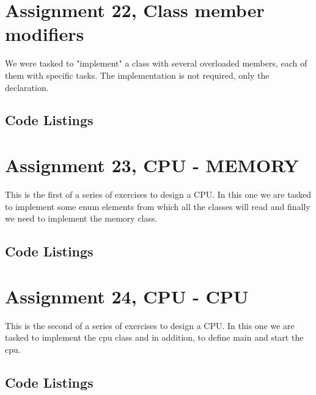 \documentclass[11pt]{article}
\begin{document}
\section*{Assignment 22, Class member modifiers}
We were tasked to "implement" a class with several overloaded members, each of them with specific tasks. The implementation is not required, only the declaration.

\subsection*{Code Listings}






\section*{Assignment 23, CPU - MEMORY}
This is the first of a series of exercises to design a CPU. In this one we are tasked to implement some enum elements from which all the classes will read and finally we need to implement the memory class.

\subsection*{Code Listings}







\section*{Assignment 24, CPU - CPU}
This is the second of a series of exercises to design a CPU. In this one we are tasked to implement the cpu class and in addition, to define main and start the cpu.

\subsection*{Code Listings}






\end{document}
